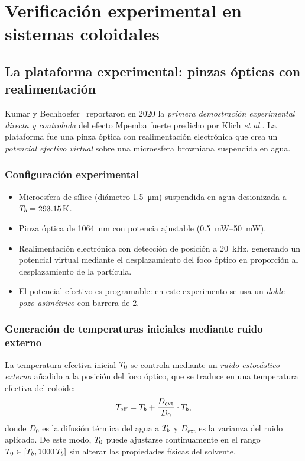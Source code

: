 \chapter{Verificación experimental en sistemas coloidales}
\label{ch:coloides}

\section{La plataforma experimental: pinzas ópticas con realimentación}

Kumar y Bechhoefer~\cite{kumar2020} reportaron en 2020 la \emph{primera 
demostración experimental directa y controlada} del efecto Mpemba fuerte 
predicho por Klich \emph{et al.}. La plataforma fue una pinza óptica con 
realimentación electrónica que crea un \emph{potencial efectivo virtual} sobre 
una microesfera browniana suspendida en agua.

\subsection{Configuración experimental}

\begin{itemize}
\item Microesfera de sílice (diámetro \SI{1.5}{\micro\meter}) suspendida en agua 
desionizada a $T_{b} = \SI{293.15}{\kelvin}$.
\item Pinza óptica de \SI{1064}{\nano\meter} con potencia ajustable (\SIrange{0.5}{50}{\milli\watt}).
\item Realimentación electrónica con detección de posición a \SI{20}{\kilo\hertz}, 
generando un potencial virtual mediante el desplazamiento del foco óptico en 
proporción al desplazamiento de la partícula.
\item El potencial efectivo es programable: en este experimento se usa un 
\emph{doble pozo asimétrico} con barrera de \SI{2}{\kBT}.
\end{itemize}

\subsection{Generación de temperaturas iniciales mediante ruido externo}

La temperatura efectiva inicial $T_{0}$ se controla mediante un \emph{ruido 
estocástico externo} añadido a la posición del foco óptico, que se traduce en 
una temperatura efectiva del coloide:
\begin{equation}
    T_{\mathrm{eff}} = T_{b} + \frac{D_{\mathrm{ext}}}{D_{0}} \cdot T_{b},
    \label{eq:T_effective}
\end{equation}
%
donde $D_{0}$ es la difusión térmica del agua a $T_{b}$ y $D_{\mathrm{ext}}$ es la 
varianza del ruido aplicado. De este modo, $T_{0}$ puede ajustarse continuamente 
en el rango $T_{0} \in [T_{b}, 1000 \, T_{b}]$ sin alterar las propiedades físicas 
del solvente.

